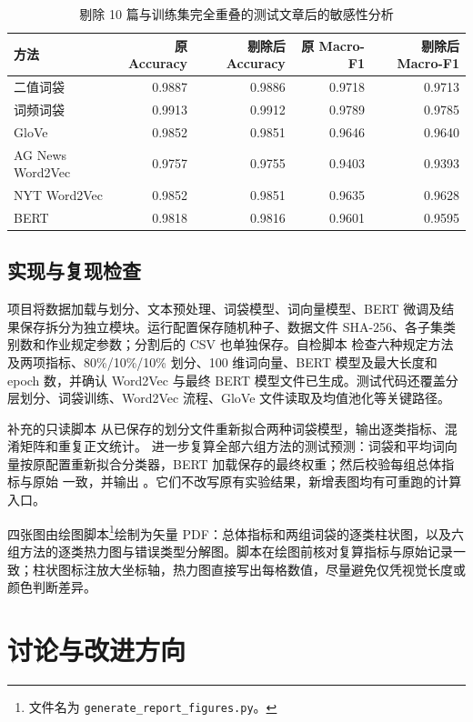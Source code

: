 \documentclass[UTF8,a4paper,10pt]{ctexart}
\begin{document}
\begin{table}[H]
  \centering
  \caption{剔除 10 篇与训练集完全重叠的测试文章后的敏感性分析}
  \label{tab:overlap-sensitivity}
  \begin{tabular}{lrrrr}
    \toprule
    方法 & 原 Accuracy & 剔除后 Accuracy & 原 Macro-F1 & 剔除后 Macro-F1 \\
    \midrule
    二值词袋 & 0.9887 & 0.9886 & 0.9718 & 0.9713 \\
    词频词袋 & 0.9913 & 0.9912 & 0.9789 & 0.9785 \\
    GloVe & 0.9852 & 0.9851 & 0.9646 & 0.9640 \\
    AG News Word2Vec & 0.9757 & 0.9755 & 0.9403 & 0.9393 \\
    NYT Word2Vec & 0.9852 & 0.9851 & 0.9635 & 0.9628 \\
    BERT & 0.9818 & 0.9816 & 0.9601 & 0.9595 \\
    \bottomrule
  \end{tabular}
\end{table}

\subsection{实现与复现检查}

项目将数据加载与划分、文本预处理、词袋模型、词向量模型、BERT 微调及结果保存拆分为独立模块。运行配置保存随机种子、数据文件 SHA-256、各子集类别数和作业规定参数；分割后的 CSV 也单独保存。自检脚本  检查六种规定方法及两项指标、80\%/10\%/10\% 划分、100 维词向量、BERT 模型及最大长度和 epoch 数，并确认 Word2Vec 与最终 BERT 模型文件已生成。测试代码还覆盖分层划分、词袋训练、Word2Vec 流程、GloVe 文件读取及均值池化等关键路径。

补充的只读脚本  从已保存的划分文件重新拟合两种词袋模型，输出逐类指标、混淆矩阵和重复正文统计。 进一步复算全部六组方法的测试预测：词袋和平均词向量按原配置重新拟合分类器，BERT 加载保存的最终权重；然后校验每组总体指标与原始  一致，并输出 。它们不改写原有实验结果，新增表图均有可重跑的计算入口。

四张图由绘图脚本\footnote{文件名为 \texttt{generate\_report\_figures.py}。}绘制为矢量 PDF：总体指标和两组词袋的逐类柱状图，以及六组方法的逐类热力图与错误类型分解图。脚本在绘图前核对复算指标与原始记录一致；柱状图标注放大坐标轴，热力图直接写出每格数值，尽量避免仅凭视觉长度或颜色判断差异。

\section{讨论与改进方向}
\enlargethispage{2\baselineskip}
\end{document}
